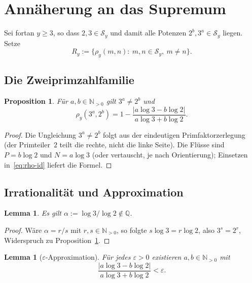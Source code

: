 \documentclass[11pt,a4paper]{article}
\newtheorem{lemma}[theorem]{Lemma}
\newtheorem{proposition}[theorem]{Proposition}
\theoremstyle{definition}
\newcommand{\N}{\mathbb{N}}
\newcommand{\Q}{\mathbb{Q}}
\newcommand{\Sy}{\mathcal{S}_y}
\newcommand{\rhoy}{\rho_y}
\newcommand{\Ry}{R_y}
\begin{document}
	\section{Ann{\"a}herung an das Supremum}
	\label{sec:sup}
	
	Sei fortan $y\ge 3$, so dass $2,3\in\Sy$ und damit alle Potenzen
	$2^b,3^a\in\Sy$ liegen. Setze
	\[
	\Ry
	:=
	\bigl\{\rhoy(m,n):\ m,n\in\Sy,\ m\neq n\bigr\}.
	\]
	
	\subsection{Die Zweiprimzahlfamilie}
	
	\begin{proposition}
		\label{prop:family}
		F{\"u}r $a,b\in\N_{>0}$ gilt $3^a\neq 2^b$ und
		\[
		\rhoy(3^a,2^b)
		=
		1-
		\frac{\lvert a\log 3-b\log 2\rvert}{a\log 3+b\log 2}.
		\]
	\end{proposition}
	
	\begin{proof}
		Die Ungleichung $3^a\neq 2^b$ folgt aus der eindeutigen Primfaktorzerlegung
		(der Primteiler~$2$ teilt die rechte, nicht die linke Seite).
		Die Fl{\"u}sse sind $P=b\log 2$ und $N=a\log 3$ (oder vertauscht, je nach
		Orientierung); Einsetzen in~\eqref{eq:rho-id} liefert die Formel.
	\end{proof}
	
	\subsection{Irrationalit{\"a}t und Approximation}
	
	\begin{lemma}
		\label{lem:irrational}
		Es gilt $\alpha:=\log 3/\log 2\notin\Q$.
	\end{lemma}
	
	\begin{proof}
		W{\"a}re $\alpha=r/s$ mit $r,s\in\N_{>0}$, so folgte
		$s\log 3=r\log 2$, also $3^s=2^r$, Widerspruch zu
		Proposition~\ref{prop:family}.
	\end{proof}
	
	\begin{lemma}[$\varepsilon$-Approximation]
		\label{lem:eps}
		F{\"u}r jedes $\varepsilon>0$ existieren $a,b\in\N_{>0}$ mit
		\[
		\frac{\lvert a\log 3-b\log 2\rvert}{a\log 3+b\log 2}<\varepsilon.
		\]
	\end{lemma}
	
\end{document}

